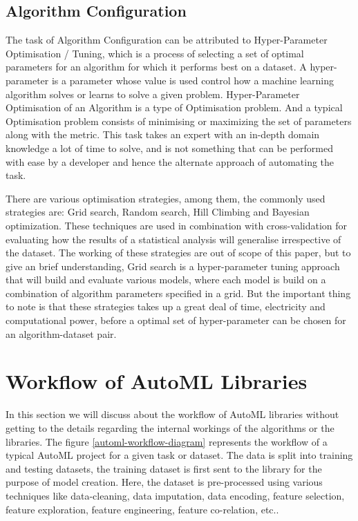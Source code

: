 \subsection{Algorithm Configuration}

The task of Algorithm Configuration can be attributed to Hyper-Parameter Optimisation / Tuning, which is a process of selecting a set of optimal parameters for an algorithm for which it performs best on a dataset. A hyper-parameter is a parameter whose value is used control how a machine learning algorithm solves or learns to solve a given problem. Hyper-Parameter Optimisation of an Algorithm is a type of Optimisation problem. And a typical Optimisation problem consists of minimising or maximizing the set of parameters along with the metric. This task takes an expert with an in-depth domain knowledge a lot of time to solve, and is not something that can be performed with ease by a developer and hence the alternate approach of automating the task.

There are various optimisation strategies, among them, the commonly used strategies are: Grid search, Random search, Hill Climbing and Bayesian optimization. These techniques are used in combination with cross-validation for evaluating how the results of a statistical analysis will generalise irrespective of the dataset. The working of these strategies are out of scope of this paper, but to give an brief understanding, Grid search is a hyper-parameter tuning approach that will build and evaluate various models, where each model is build on a combination of algorithm parameters specified in a grid. But the important thing to note is that these strategies takes up a great deal of time, electricity and computational power, before a optimal set of hyper-parameter can be chosen for an algorithm-dataset pair.

\section{Workflow of AutoML Libraries}
\label{workflow-automl}

In this section we will discuss about the workflow of AutoML libraries without getting to the details regarding the internal workings of the algorithms or the libraries. The figure \ref{automl-workflow-diagram} represents the workflow of a typical AutoML project for a given task or dataset. The data is split into training and testing datasets, the training dataset is first sent to the library for the purpose of model creation. Here, the dataset is pre-processed using various techniques like data-cleaning, data imputation, data encoding, feature selection, feature exploration, feature engineering, feature co-relation, etc..

